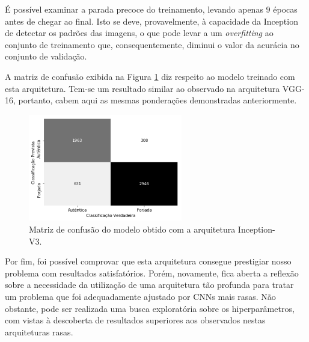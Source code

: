 É possível examinar a parada precoce do treinamento, levando apenas $9$ épocas antes de chegar ao final. Isto se deve, provavelmente, à capacidade da Inception de detectar os padrões das imagens, o que pode levar a um \emph{overfitting} ao conjunto de treinamento que, consequentemente, diminui o valor da acurácia no conjunto de validação.

A matriz de confusão exibida na Figura \ref{fig:matrizes-inception} diz respeito ao modelo treinado com esta arquitetura. Tem-se um resultado similar ao observado na arquitetura VGG-16, portanto, cabem aqui as mesmas ponderações demonstradas anteriormente.

\begin{figure}[h]
    \centering
    \caption{Matriz de confusão do modelo obtido com a arquitetura Inception-V3.}\label{fig:matrizes-inception}
    \includegraphics[width=0.6\textwidth]{imgs/matriz-inception}
\end{figure}

Por fim, foi possível comprovar que esta arquitetura consegue prestigiar nosso problema com resultados satisfatórios. Porém, novamente, fica aberta a reflexão sobre a necessidade da utilização de uma arquitetura tão profunda para tratar um problema que foi adequadamente ajustado por CNNs mais rasas. Não obstante, pode ser realizada uma busca exploratória sobre os hiperparâmetros, com vistas à descoberta de resultados superiores aos observados nestas arquiteturas rasas.